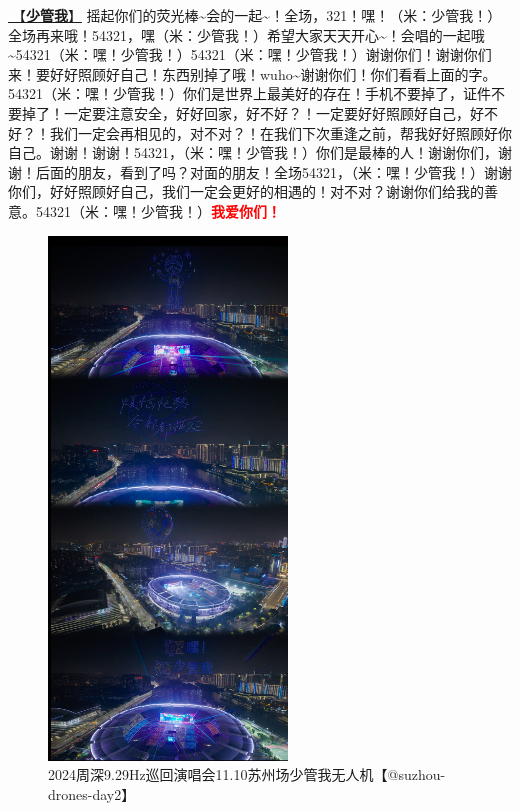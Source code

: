 \documentclass[]{ctexbook}
\begin{document}
\hyperref[watch-ur-manners]{🎵【\textbf{少管我}】} 摇起你们的荧光棒\textasciitilde 会的一起\textasciitilde！全场，321！嘿！（米：少管我！）全场再来哦！54321，嘿（米：少管我！）希望大家天天开心\textasciitilde！会唱的一起哦\textasciitilde54321（米：嘿！少管我！）54321（米：嘿！少管我！）谢谢你们！谢谢你们来！要好好照顾好自己！东西别掉了哦！wuho\textasciitilde 谢谢你们！你们看看上面的字。54321（米：嘿！少管我！）你们是世界上最美好的存在！手机不要掉了，证件不要掉了！一定要注意安全，好好回家，好不好？！一定要好好照顾好自己，好不好？！我们一定会再相见的，对不对？！在我们下次重逢之前，帮我好好照顾好你自己。谢谢！谢谢！54321，（米：嘿！少管我！）你们是最棒的人！谢谢你们，谢谢！后面的朋友，看到了吗？对面的朋友！全场54321，（米：嘿！少管我！）谢谢你们，好好照顾好自己，我们一定会更好的相遇的！对不对？谢谢你们给我的善意。54321（米：嘿！少管我！）\textbf{\textcolor{red}{我爱你们！} }

\begin{figure}

{\centering \includegraphics[width=180pt]{img/suzhou20241110/002} 

}

\caption{2024周深9.29Hz巡回演唱会11.10苏州场少管我无人机【@suzhou-drones-day2】}\label{fig:unnamed-chunk-115}
\end{figure}
\end{document}
